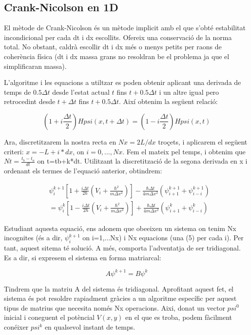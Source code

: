 \documentclass{article}
\begin{document}
\subsection{Crank-Nicolson en 1D}

El mètode de Crank-Nicolson és un mètode implicit amb el que s'obté estabilitat incondicional per cada dt i dx escollits. Ofereix una conservació de la norma total. No obstant, caldrà escollir dt i dx més o menys petits per raons de coherència física (dt i dx massa grans no resoldran be el problema ja que el simplificaran massa).

L'algoritme i les equacions a utiltzar es poden obtenir aplicant una derivada de temps de \(0.5\Delta t \) desde l'estat actual \(t\) fins \(t+0.5\Delta t\) i un altre igual pero retrocedint desde \(t+\Delta t\) fins \(t+0.5\Delta t\). Així obtenim la següent relació:
			
\begin{equation}
(1+i\frac{\Delta t}{2})Hpsi(x,t+\Delta t)=(1-i\frac{\Delta t}{2})Hpsi(x,t)
\end{equation}
	
Ara, discretitzarem la nostra recta en \(Nx=2L/dx\) troçets, i aplicarem el següent criteri: \(x=-L+i*dx\), on \(i=0,...,Nx\). Fem el mateix pel temps, i obtenim que \(Nt=\frac{t_b-t_a}{dt}\) on t=tb+k*dt. Utilitzant la discretització de la segona derivada en x i ordenant els termes de l'equació anterior, obtindrem:


\begin{align}
&\psi_i^{k+1}[1+\frac{i\Delta t}{2\hbar}(V_i+\frac{\hbar^2}{m\Delta x ^2})]-\frac{\hbar\Delta t}{4m \Delta x^2}(\psi_{i+1}^{k+1}+\psi_{i-i}^{k+1})\\
&=\psi_i^{k}[1-\frac{i\Delta t}{2\hbar}(V_i+\frac{\hbar^2}{m\Delta x ^2})]+\frac{\hbar\Delta t}{4m \Delta x^2}(\psi_{i+1}^{k}+\psi_{i-i}^{k})
\end{align}


Estudiant aquesta equació, ens adonem que obeeixen un sistema on tenim Nx incognites (és a dir, \(\psi_i^{k+1}\) on i=1,...Nx) i Nx equacions (una (5) per cada i). Per tant, aquest sitema té solució. A més, comporta l'adventatja de ser tridiagonal. Es a dir, si expresem el sistema en forma matriarcal:

\begin{equation}
A\psi^{k+1}=B\psi^{k}
\end{equation}   

Tindrem que la matriu A del sistema és tridiagonal. Aprofitant aquest fet, el sistema és pot resoldre rapiadment gràcies a un algoritme específic per aquest tipus de matrius que necesita només Nx operacions. Aixi, donat un vector \(psi^0\) inicial i coneguent el potèncial \(V(x,y)\) en el que es troba, podem fàcilment conéixer \(psi^k\) en qualsevol instant de temps. 
\end{document}
